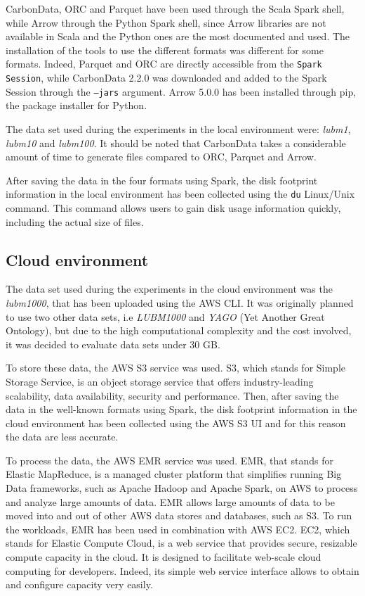 \documentclass[10pt, a4paper]{report}
\begin{document}
CarbonData, ORC and Parquet have been used through the Scala\cite{scala} Spark shell, while Arrow through the Python Spark shell, since Arrow libraries are not available in Scala and the Python ones are the most documented and used. The installation of the tools to use the different formats was different for some formats. Indeed, Parquet and ORC are directly accessible from the \texttt{Spark Session}, while CarbonData 2.2.0 was downloaded and added to the Spark Session through the \texttt{--jars} argument. Arrow 5.0.0 has been installed through pip\cite{pip}, the package installer for Python.

The data set used during the experiments in the local environment were: \textit{lubm1}, \textit{lubm10} and \textit{lubm100}. It should be noted that CarbonData takes a considerable amount of time to generate files compared to ORC, Parquet and Arrow.

After saving the data in the four formats using Spark, the disk footprint information in the local environment has been collected using the \texttt{du} Linux/Unix command. This command allows users to gain disk usage information quickly, including the actual size of files.

\subsection{Cloud environment}

\label{subsection:cloud_environment}

The data set used during the experiments in the cloud environment was the \textit{lubm1000}, that has been uploaded using the AWS CLI\cite{aws_cli}. It was originally planned to use two other data sets, i.e \textit{LUBM1000} and \textit{YAGO} (Yet Another Great Ontology), but due to the high computational complexity and the cost involved, it was decided to evaluate data sets under 30 GB.

To store these data, the AWS S3 service was used. S3, which stands for Simple Storage Service, is an object storage service that offers industry-leading scalability, data availability, security and performance\cite{aws_s3}. Then, after saving the data in the well-known formats using Spark, the disk footprint information in the cloud environment has been collected using the AWS S3 UI and for this reason the data are less accurate.

To process the data, the AWS EMR service was used. EMR, that stands for Elastic MapReduce, is a managed cluster platform that simplifies running Big Data frameworks, such as Apache Hadoop and Apache Spark, on AWS to process and analyze large amounts of data\cite{aws_emr}. EMR allows large amounts of data to be moved into and out of other AWS data stores and databases, such as S3. To run the workloads, EMR has been used in combination with AWS EC2. EC2, which stands for Elastic Compute Cloud, is a web service that provides secure, resizable compute capacity in the cloud. It is designed to facilitate web-scale cloud computing for developers. Indeed, its simple web service interface allows to obtain and configure capacity very easily\cite{aws_ec2}.
\end{document}
